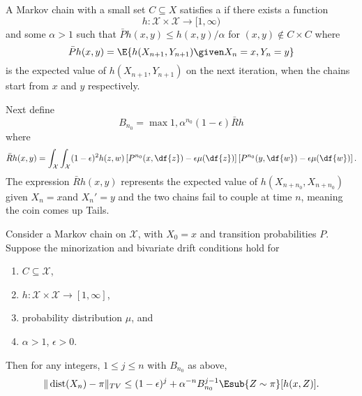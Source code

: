 \documentclass[12pt]{article}
\begin{document}
\begin{definition}
    A Markov chain with a small set \( C \subseteq X \) satisfies a
     if there exists a function
    \[
        h :  \mathcal{X} \times \mathcal{X} \to [1, \infty)
    \] and some \( \alpha > 1 \) such that \( \bar{P}h(x,y) \le h(x,y)/\alpha
    \) for \( (x,y) \notin C \times C \) where
    \[
        \bar{P}h(x,y)= \E{h(X_{n+1}, Y_{n+1}) \given X_n = x, Y_n = y}
    \] is the expected value of \( h(X_{n+1}, Y_{n+1}) \) on the next
    iteration, when the chains start from \( x \) and \( y \)
    respectively.
\end{definition}

Next define
\[
    B_{n_0} = \max{1, \alpha^{n_0}(1-\epsilon) \bar{R}h}
\] where
\[
    \bar{R}h(x,y) = \int_{\mathcal{X}} \int_{\mathcal{X}} (1-\epsilon)^2
    h(z,w) \left[ P^{n_0}(x, \df{z}) - \epsilon \mu(\df{z}) \right]
    \left[ P^{n_0}(y, \df{w}) - \epsilon \mu(\df{w}) \right].
\] The expression \( \bar{R}h(x,y) \) represents the expected value of \(
h(X_{n+{n_0}}, X_{n+{n_0}}) \) given \( X_n = x \)and \( X_n' = y \) and
the two chains fail to couple at time \( n \), meaning the coin comes up
Tails.

\begin{theorem}
    Consider a Markov chain on \( \mathcal{X} \), with \( X_0 = x \) and
    transition probabilities \( P \).  Suppose the minorization and
    bivariate drift conditions hold for
    \begin{enumerate}
        \item
            \( C \subseteq \mathcal{X} \),
        \item
            \( h :  \mathcal{X} \times \mathcal{X} \to [1, \infty] \),
        \item
            probability distribution \( \mu \), and
        \item
            \( \alpha > 1 \), \( \epsilon >0 \).
    \end{enumerate}
    Then for any integers, \( 1 \le j \le n \) with \( B_{n_0} \) as
    above,
    \[
        \|
        \operatorname{dist}
        (X_n) - \pi \|_{TV} \le (1-\epsilon)^j + \alpha^{-n} B_{n_0}^{j-1}
        \Esub{Z \sim \pi}[h(x,Z)].
    \]

\end{theorem}
\end{document}
